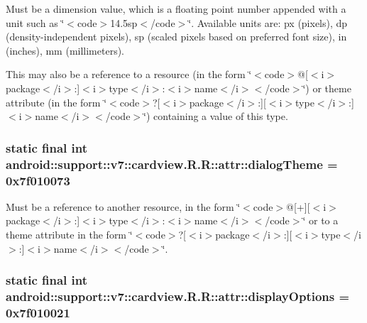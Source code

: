 Must be a dimension value, which is a floating point number appended with a unit such as \char`\"{}$<$code$>$14.5sp$<$/code$>$\char`\"{}. Available units are: px (pixels), dp (density-independent pixels), sp (scaled pixels based on preferred font size), in (inches), mm (millimeters). 

This may also be a reference to a resource (in the form \char`\"{}$<$code$>$@\mbox{[}$<$i$>$package$<$/i$>$:\mbox{]}$<$i$>$type$<$/i$>$:$<$i$>$name$<$/i$>$$<$/code$>$\char`\"{}) or theme attribute (in the form \char`\"{}$<$code$>$?\mbox{[}$<$i$>$package$<$/i$>$:\mbox{]}\mbox{[}$<$i$>$type$<$/i$>$:\mbox{]}$<$i$>$name$<$/i$>$$<$/code$>$\char`\"{}) containing a value of this type. \hypertarget{classandroid_1_1support_1_1v7_1_1cardview_1_1_r_1_1attr_9ae1b8bafd56f7b03842b3c0c4b2777a}{
\subsubsection[{dialogTheme}]{\setlength{\rightskip}{0pt plus 5cm}static final int android::support::v7::cardview.R.R::attr::dialogTheme = 0x7f010073}}
\label{classandroid_1_1support_1_1v7_1_1cardview_1_1_r_1_1attr_9ae1b8bafd56f7b03842b3c0c4b2777a}


Must be a reference to another resource, in the form \char`\"{}$<$code$>$@\mbox{[}+\mbox{]}\mbox{[}$<$i$>$package$<$/i$>$:\mbox{]}$<$i$>$type$<$/i$>$:$<$i$>$name$<$/i$>$$<$/code$>$\char`\"{} or to a theme attribute in the form \char`\"{}$<$code$>$?\mbox{[}$<$i$>$package$<$/i$>$:\mbox{]}\mbox{[}$<$i$>$type$<$/i$>$:\mbox{]}$<$i$>$name$<$/i$>$$<$/code$>$\char`\"{}. \hypertarget{classandroid_1_1support_1_1v7_1_1cardview_1_1_r_1_1attr_2f7365a8ace079fceeaf1985fdf19c5b}{
\subsubsection[{displayOptions}]{\setlength{\rightskip}{0pt plus 5cm}static final int android::support::v7::cardview.R.R::attr::displayOptions = 0x7f010021}}
\label{classandroid_1_1support_1_1v7_1_1cardview_1_1_r_1_1attr_2f7365a8ace079fceeaf1985fdf19c5b}


